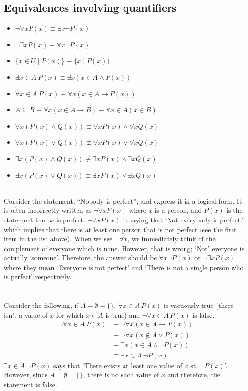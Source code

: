 \documentclass[../setup.tex]{subfiles}
\begin{document}
\subsection{Equivalences involving quantifiers}
\begin{itemize}
	\item $\lnot\forall xP(x) \equiv \exists x\lnot P(x)$
	\item $\lnot\exists xP(x) \equiv \forall x\lnot P(x)$
	\item $\{x\in U \mid P(x)\} \equiv \{x \mid P(x)\}$
	\item $\exists x \in A \ P(x) \equiv \exists x \left(x\in A \land P(x)\right)$
	\item $\forall x \in A \ P(x) \equiv \forall x \left(x\in A \rightarrow P(x)\right)$
	\item $A\subseteq B \equiv \forall x(x\in A \rightarrow B) \equiv \forall x\in A (x\in B)$
	\item $\forall x\left(P(x) \land Q(x)\right) \equiv \forall xP(x) \land \forall xQ(x)$
	\item $\forall x\left(P(x) \lor Q(x)\right) \not\equiv \forall xP(x) \lor \forall xQ(x)$
	\item $\exists x\left(P(x) \land Q(x)\right) \not\equiv \exists xP(x) \land \exists xQ(x)$
	\item $\exists x\left(P(x) \lor Q(x)\right) \equiv \exists xP(x) \lor \exists xQ(x)$
\end{itemize}
\phantom \\
Consider the statement, ``Nobody is perfect'', and express it in a logical form. It is often incorrectly written as $\lnot\forall xP(x)$ where $x$ is a person, and $P(x)$ is the statement that $x$ is perfect. $\lnot\forall xP(x)$ is saying that `Not everybody is perfect.' which implies that there is at least one person that is not perfect (see the first item in the list above). When we see $\lnot\forall x$, we immediately think of the complement of everyone which is none. However, that is wrong; `Not' everyone is actually `someone'. Therefore, the answer should be $\forall x\lnot P(x)$ or $\lnot\exists xP(x)$ where they mean `Everyone is not perfect' and `There is not a single person who is perfect' respectively. \\

\clearpage
\phantom \\ \\
Consider the following, if $A = \emptyset = \{\}$, $\forall x \in A \ P(x)$ is vacuously true (there isn't a value of $x$ for which $x \in A$ is true) and $\lnot\forall x \in A \ P(x)$ is false. \\
\begin{align*}
\lnot\forall x \in A \ P(x) &\equiv \lnot\forall x(x\in A \rightarrow P(x)) \\
&\equiv \lnot\forall x(x \notin A \lor P(x)) \\ 
&\equiv \exists x(x \in A \land \lnot P(x)) \\
&\equiv \exists x\in A \ \lnot P(x)
\end{align*}
$\exists x\in A \ \lnot P(x)$ says that `There exists at least one value of $x$ st. $\lnot P(x)$'. However, since  $A = \emptyset = \{\}$, there is no such value of $x$ and therefore, the statement is false.
\end{document}
